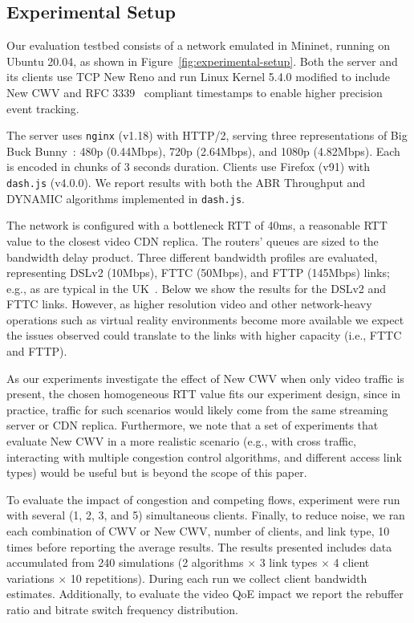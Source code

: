 \documentclass[10pt,sigconf]{acmart}
\begin{document}
\subsection{Experimental Setup}
\label{sec:experimental-setup}

Our evaluation testbed consists of a network emulated in Mininet, running on Ubuntu 20.04, as shown in Figure~\ref{fig:experimental-setup}. Both the server and its clients use TCP New Reno and run Linux Kernel 5.4.0 modified to include New CWV and RFC 3339~\cite{rfc3339-precise-timestamps} compliant timestamps to enable higher precision event tracking. 

The server uses \texttt{nginx} (v1.18) with HTTP/2, serving three representations of Big Buck Bunny~\cite{online-bbb}: 480p (0.44Mbps), 720p (2.64Mbps), and 1080p (4.82Mbps). Each is encoded in chunks of 3 seconds duration.
Clients use Firefox (v91) with \texttt{dash.js} (v4.0.0). We
report results with both the ABR Throughput and DYNAMIC \cite{Spiteri-2019-from-theory-to-practice-sabre} algorithms implemented in \texttt{dash.js}.

The network is configured with a bottleneck RTT of 40ms, a reasonable RTT value to the closest video CDN replica. The routers' queues are sized to the bandwidth delay product. Three different bandwidth profiles are evaluated, representing DSLv2 (10Mbps), FTTC (50Mbps), and FTTP (145Mbps) links; e.g., as are typical in the UK~\cite{online-ofcom-report}. Below we show the results for the DSLv2 and FTTC links. However, as higher resolution video and other network-heavy operations such as virtual reality environments become more available we expect the issues observed could translate to the links with higher capacity (i.e., FTTC and FTTP).

As our experiments investigate the effect of New CWV when only video traffic is present, the chosen homogeneous RTT value fits our experiment design, since in practice, traffic for such scenarios would likely come from the same streaming server or CDN replica. Furthermore, we note that a set of experiments that evaluate New CWV in a more realistic scenario (e.g., with cross traffic, interacting with multiple congestion control algorithms, and different access link types) would be useful but is beyond the scope of this paper.

To evaluate the impact of congestion and competing flows, experiment were run with several (1, 2, 3, and 5) simultaneous clients. Finally, to reduce noise, we ran each combination of CWV or New CWV, number of clients, and link type, 10 times before reporting the average results. The results presented includes data accumulated from 240 simulations (2 algorithms $\times$ 3 link types $\times$ 4 client variations $\times$ 10 repetitions). 
During each run we collect client bandwidth estimates. Additionally, to evaluate the video QoE impact we report the rebuffer ratio and bitrate switch frequency distribution.
\end{document}
